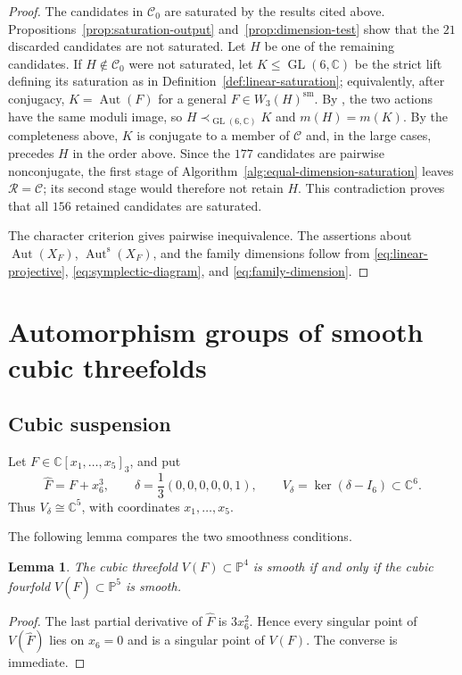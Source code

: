 \documentclass[12pt]{amsart}
\numberwithin{equation}{section}
\theoremstyle{plain}
\newtheorem{lem}[thm]{Lemma}
\theoremstyle{definition}
\theoremstyle{remark}
\newcommand{\CC}{\mathbb C}
\newcommand{\PP}{\mathbb P}
\DeclareMathOperator{\Aut}{Aut}
\DeclareMathOperator{\GL}{GL}
\newcommand{\Auts}{\Aut^{\mathrm s}}
\begin{document}
\begin{proof}
The candidates in $\mathscr C_0$ are saturated by the results cited above.
Propositions~\ref{prop:saturation-output} and~\ref{prop:dimension-test}
show that the $21$ discarded candidates are not saturated.  Let $H$ be one
of the remaining candidates.  If $H\notin\mathscr C_0$ were not saturated,
let $K\leq\GL(6,\CC)$ be the strict lift defining its saturation as in
Definition~\ref{def:linear-saturation}; equivalently, after conjugacy,
$K=\Aut(F)$ for a general $F\in W_3(H)^{\mathrm{sm}}$.
By \cite[Proposition--Definition~3.5]{FZ26}, the two actions have the same
moduli image, so $H\prec_{\GL(6,\CC)}K$ and $m(H)=m(K)$.  By the
completeness above, $K$ is conjugate to a member of $\mathscr C$ and, in
the large cases, precedes $H$ in the order above.  Since the
$177$ candidates are pairwise nonconjugate, the first stage of
Algorithm~\ref{alg:equal-dimension-saturation} leaves
$\mathscr R=\mathscr C$; its second stage would therefore not retain $H$.
This contradiction proves that all $156$ retained candidates are saturated.

The character criterion gives pairwise inequivalence.  The assertions about
$\Aut(X_F)$, $\Auts(X_F)$, and the family dimensions follow from
\eqref{eq:linear-projective}, \eqref{eq:symplectic-diagram}, and
\eqref{eq:family-dimension}.
\end{proof}

\section{Automorphism groups of smooth cubic threefolds}

\subsection{Cubic suspension}

Let \(F\in\CC[x_1,\ldots,x_5]_3\), and put
\[
 \widehat F=F+x_6^3,\qquad
 \delta=\frac13(0,0,0,0,0,1),\qquad
 V_\delta=\ker(\delta-I_6)\subset\CC^6.
\]
Thus \(V_\delta\cong\CC^5\), with coordinates \(x_1,\ldots,x_5\).

The following lemma compares the two smoothness conditions.

\begin{lem}\label{lem:threefold-suspension-smooth}
The cubic threefold \(V(F)\subset\PP^4\) is smooth if and only if the cubic
fourfold \(V(\widehat F)\subset\PP^5\) is smooth.
\end{lem}

\begin{proof}
The last partial derivative of \(\widehat F\) is \(3x_6^2\).  Hence every
singular point of \(V(\widehat F)\) lies on \(x_6=0\) and is a singular point
of \(V(F)\).  The converse is immediate.
\end{proof}
\end{document}

